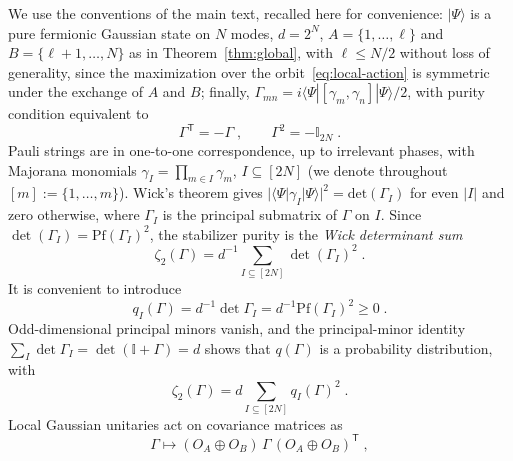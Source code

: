 \documentclass[prx,twocolumn,superscriptaddress,aps,10pt, frontmatterverbose, reprint,footinbib,longbibliography=true]{revtex4-2}
\newcommand{\trans}{\mathsf{T}}
\providecommand{\DIFaddtex}[1]{{\protect\color{red}#1}} %
\providecommand{\DIFaddbegin}{\protect\color{red}} %
\providecommand{\DIFaddend}{\protect\color{black}} %
\providecommand{\DIFaddtex}[1]{\texorpdfstring{\DIFaddtex{#1}}{#1}} %
\providecommand{\DIFadd}[1]{\texorpdfstring{\DIFaddtex{#1}}{#1}} %
\newcommand{\DIFaddincludegraphics}[2][]{{\color{blue}\fbox{\DIFOincludegraphics[#1]{#2}}}} %
\DeclareRobustCommand{\DIFaddbegin}{\DIFOaddbegin \let\includegraphics\DIFaddincludegraphics} %
\DeclareRobustCommand{\DIFaddend}{\DIFOaddend \let\includegraphics\DIFOincludegraphics} %
\begin{document}
We use the conventions of the main text, recalled here for convenience: $|\Psi\rangle$ is a pure fermionic Gaussian state on $N$ modes, $d=2^N$, \DIFaddbegin \DIFadd{$A=\{1,\dots,\ell\}$ and $B=\{\ell+1,\dots,N\}$ as in Theorem~\ref{thm:global}, with $\ell\le N/2$ }\DIFaddend without loss of generality\DIFaddbegin \DIFadd{, since the maximization over the orbit~\eqref{eq:local-action} is symmetric under the exchange of $A$ and $B$; finally, }\DIFaddend $\Gamma_{mn}=i\langle\Psi|[\gamma_m,\gamma_n]|\Psi\rangle/2$, with purity condition equivalent to
\begin{equation}
    \Gamma^{\trans}=-\Gamma\;,\qquad \Gamma^2=-\mathbb{I}_{2N}\;.
    \label{eq:pure-covariance}
\end{equation}
Pauli strings are in one-to-one correspondence, up to irrelevant phases, with Majorana monomials $\gamma_I=\prod_{m\in I}\gamma_m$, $I\subseteq[2N]$ (we denote throughout $[m]:=\{1,\dots,m\}$). Wick's theorem gives $|\langle\Psi|\gamma_I|\Psi\rangle|^2=\mathrm{det}(\Gamma_I)$ for even $|I|$ and zero otherwise, where $\Gamma_I$ is the principal submatrix of $\Gamma$ on $I$. Since $\det(\Gamma_I)=\mathrm{Pf}(\Gamma_I)^2$, the stabilizer purity is the \emph{Wick determinant sum}
\begin{equation}
    \zeta_2(\Gamma)=d^{-1}\sum_{I\subseteq[2N]}\det(\Gamma_I)^2\;.
    \label{eq:zeta-M}
\end{equation}
It is convenient to introduce
\begin{equation}
    q_I(\Gamma)=d^{-1}\det\Gamma_I=d^{-1}\mathrm{Pf}(\Gamma_I)^2\ge 0\;.
    \label{eq:q-definition}
\end{equation}
Odd-dimensional principal minors vanish, and the principal-minor identity $\sum_I\det\Gamma_I=\det(\mathbb{I}+\Gamma)=d$ shows that $q(\Gamma)$ is a probability distribution, with
\begin{equation}
    \zeta_2(\Gamma)=d\sum_{I\subseteq[2N]} q_I(\Gamma)^2\;.
    \label{eq:q-collision}
\end{equation}
Local Gaussian unitaries act on covariance matrices as
\begin{equation}
    \Gamma\longmapsto (O_A\oplus O_B)\,\Gamma\,(O_A\oplus O_B)^{\trans}\;,
    \label{eq:local-action}
\end{equation}
\end{document}
